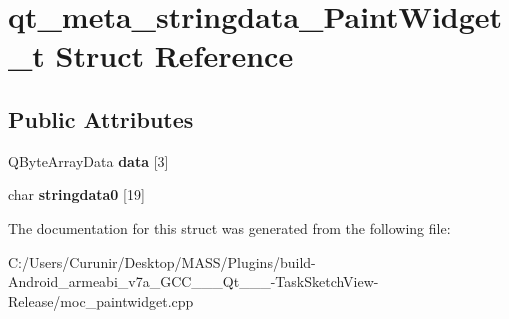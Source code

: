 \hypertarget{structqt__meta__stringdata___paint_widget__t}{}\section{qt\+\_\+meta\+\_\+stringdata\+\_\+\+Paint\+Widget\+\_\+t Struct Reference}
\label{structqt__meta__stringdata___paint_widget__t}
\subsection*{Public Attributes}
\begin{DoxyCompactItemize}
\item 
\mbox{\label{structqt__meta__stringdata___paint_widget__t_a5a3b5bd01fe537a5c9c754bef68dcd9c}} 
Q\+Byte\+Array\+Data {\bfseries data} \mbox{[}3\mbox{]}
\item 
\mbox{\label{structqt__meta__stringdata___paint_widget__t_abc8551923f6d3069b3125bfc2ffcfe82}} 
char {\bfseries stringdata0} \mbox{[}19\mbox{]}
\end{DoxyCompactItemize}


The documentation for this struct was generated from the following file\+:\begin{DoxyCompactItemize}
\item 
C\+:/\+Users/\+Curunir/\+Desktop/\+M\+A\+S\+S/\+Plugins/build-\/\+Android\+\_\+armeabi\+\_\+v7a\+\_\+\+G\+C\+C\+\_\+\_\+\_\+\+Qt\+\_\+\_\+\_-\/\+Task\+Sketch\+View-\/\+Release/moc\+\_\+paintwidget.\+cpp\end{DoxyCompactItemize}
